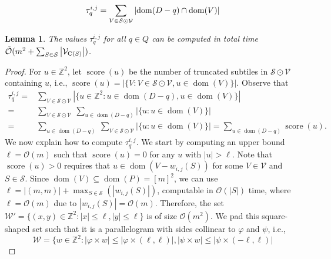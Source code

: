 \documentclass[a4paper,11pt]{article}
\newtheorem{lemma}{Lemma}[section]
\newcommand{\Z}{\mathbb{Z}}
\renewcommand{\O}{\mathcal{O}}
\newcommand{\tO}{\tilde{\mathcal{O}}}
\renewcommand{\S}{\mathcal{S}}
\newcommand{\V}{\mathcal{V}}
\newcommand{\W}{\mathcal{W}}
\renewcommand{\phi}{\varphi}
\DeclareMathOperator*{\score}{score}
\DeclareMathOperator*{\dom}{dom}
\newcommand{\absolute}[1]{\left\lvert#1\right\rvert}
\begin{document}
\begin{align}
\label{eq:group_by_gamma}
\tau_q^{i,j} = \sum_{V \in \S \odot \V} \absolute{\d{D-q} \cap \d{V}}
\end{align}


\begin{lemma}\label{primitive_conv}
The values $\tau_q^{i,j}$ for all $q \in Q$ can be computed in total time $\tO(m^2 + \sum_{S \in \S} \absolute{\V_{\getchar{S}}})$. 
\end{lemma}
\begin{proof}
For $u \in \Z^2$, let $\score(u)$ be the number of truncated subtiles in $\S \odot \V$ containing $u$, i.e., $\score(u) = \absolute{\{V : V \in \S \odot \V, u \in \dom(V)\}}$. Observe that
%
\begin{equation}
\begin{split}
\tau_q^{i,j} =&\sum_{V \in \S \odot \V} \absolute{\{u \in \Z^2 : u \in \dom(D-q), u \in \dom(V)\}}\\
=&\sum_{V \in \S \odot \V}\ \sum_{u \in \dom(D-q)}  \absolute{\{u : u \in \dom(V)\}}\\
=&\sum_{u \in \dom(D-q)}\ \sum_{V \in \S \odot \V} \absolute{\{u : u \in \dom(V)\}} = \sum_{u \in \dom(D-q)} \score(u).
\end{split}
\end{equation}
We now explain how to compute $\tau_q^{i,j}$. 
We start by computing an upper bound $\ell = \O(m)$ such that $\score(u) = 0$ for any $u$ with $\absolute{u} > \ell$. Note that $\score(u)>0$ requires that $u \in \dom(V - w_{i,j}(S))$ for some $V \in \V$ and $S \in \S$. Since $\dom(V) \subseteq \dom(P) = [m]^2$, we can use $\ell = \absolute{(m,m)} + \max_{S \in \S}(\absolute{w_{i, j}(S)})$, computable in $\O(\absolute{S})$ time, where $\ell = \O(m)$ due to $\absolute{w_{i,j}(S)} = \O(m)$.
%
Therefore, the set $\W' = \{(x,y) \in \Z^2 : \absolute{x} \le \ell, \absolute{y} \le \ell \}$ is of size $\O(m^2)$. 
We pad this square-shaped set such that it is a parallelogram with sides collinear to $\phi$ and $\psi$, i.e., 
$$\W = \{ w \in \mathbb Z^2 : \absolute{\phi \times w} \leq \absolute{\phi \times (\ell, \ell)}, \absolute{\psi \times w} \leq \absolute{\psi \times (-\ell, \ell)}$$


\end{proof}
\end{document}

